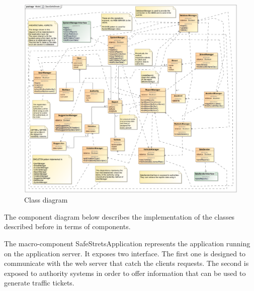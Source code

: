 \begin{figure}[H]
	\centering
	\includegraphics[width=1.12\linewidth]{Images/ClassSafeStreets.png}
	\caption{Class diagram}
\end{figure}

The component diagram below describes the implementation of the classes described before in terms of components.

The macro-component SafeStretsApplication represents the application running on the application server. It exposes two interface. The first one is designed to communicate with the web server that catch the clients requests. The second is exposed to authority systems in order to offer information that can be used to generate traffic tickets.

